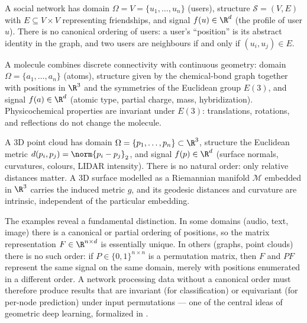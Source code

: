 \begin{example}
\label{ex:found:graph}
A social network has domain $\Omega = V = \{u_1, \ldots, u_n\}$ (users),
structure $\mathcal{S} = (V, E)$ with $E \subseteq V \times V$ representing
friendships, and signal $f(u) \in \R^d$ (the profile of user $u$). There is no
canonical ordering of users: a user's ``position'' is its abstract identity in
the graph, and two users are neighbours if and only if $(u_i, u_j) \in E$.
\end{example}

\begin{example}[Molecule]
\label{ex:found:molecule}
A molecule combines discrete connectivity with continuous geometry: domain
$\Omega = \{a_1, \ldots, a_n\}$ (atoms), structure given by the chemical-bond
graph together with positions in $\R^3$ and the symmetries of the Euclidean
group $E(3)$, and signal $f(a) \in \R^d$ (atomic type, partial charge, mass,
hybridization). Physicochemical properties are invariant under $E(3)$:
translations, rotations, and reflections do not change the molecule.
\end{example}

\begin{example}
\label{ex:found:pointcloud}
A 3D point cloud has domain $\Omega = \{p_1, \ldots, p_n\} \subset \R^3$,
structure the Euclidean metric $d(p_i, p_j) = \norm{p_i - p_j}_2$, and signal
$f(p) \in \R^d$ (surface normals, curvatures, colours, LIDAR intensity). There is
no natural order: only relative distances matter. A 3D surface modelled as a
Riemannian manifold $\mathcal{M}$ embedded in $\R^3$ carries the induced metric
$g$, and its geodesic distances and curvature are intrinsic, independent of the
particular embedding.
\end{example}

\begin{remark}
\label{rem:found:permutation}
The examples reveal a fundamental distinction. In some domains (audio, text,
image) there is a canonical or partial ordering of positions, so the matrix
representation $F \in \R^{n \times d}$ is essentially unique. In others (graphs,
point clouds) there is no such order: if $P \in \{0,1\}^{n \times n}$ is a
permutation matrix, then $F$ and $PF$ represent the same signal on the same
domain, merely with positions enumerated in a different order. A network
processing data without a canonical order must therefore produce results that are
invariant (for classification) or equivariant (for per-node prediction) under
input permutations --- one of the central ideas of geometric deep learning,
formalized in .
\end{remark}

